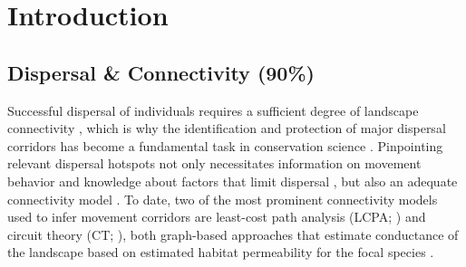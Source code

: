 \documentclass[abstract=on,10pt,a4paper,bibliography=totocnumbered]{article}
\begin{document}
\newpage

\onehalfspacing
\tableofcontents
\doublespacing

\newpage
{}


\section{Introduction}
\subsection{Dispersal \& Connectivity (90\%)}
Successful dispersal of individuals requires a sufficient degree of landscape
connectivity \citep{Fahrig.2003, Clobert.2012}, which is why the identification
and protection of major dispersal corridors has become a fundamental task in
conservation science \citep{Nathan.2008, Doerr.2011, Rudnick.2012}. Pinpointing
relevant dispersal hotspots not only necessitates information on movement
behavior and knowledge about factors that limit dispersal \citep{Baguette.2013,
Vasudev.2015, Hofmann.2021}, but also an adequate connectivity model
\citep{Diniz.2020}. To date, two of the most prominent connectivity models used
to infer movement corridors are least-cost path analysis (LCPA;
\citealp{Adriaensen.2003}) and circuit theory (CT; \citealp{McRae.2006,
McRae.2008}), both graph-based approaches that estimate conductance of the
landscape based on estimated habitat permeability for the focal species
\citep{Zeller.2012}.

\end{document}
